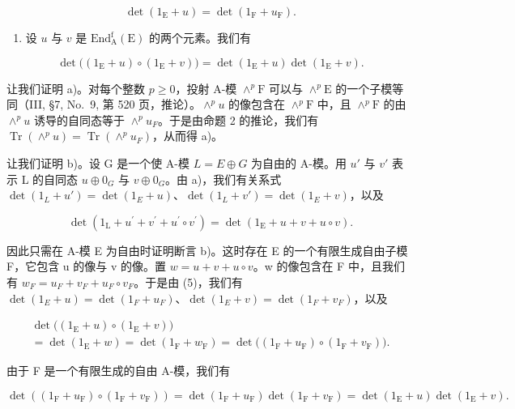 \[
\det (1 _ {\mathrm{E}} + u) = \det (1 _ {\mathrm{F}} + u _ {\mathrm{F}}).\tag{5}
\]

\begin{enumerate}
\def\labelenumi{\alph{enumi})}
\setcounter{enumi}{1}
\tightlist
\item
  设 \(u\) 与 \(v\) 是 \(\mathrm{End}_{\mathrm{A}}^{\mathrm{f}}(\mathrm{E})\) 的两个元素。我们有
\end{enumerate}

\[
\det \bigl ((1 _ {\mathrm{E}} + u) \circ (1 _ {\mathrm{E}} + v) \bigr) = \det (1 _ {\mathrm{E}} + u) \det (1 _ {\mathrm{E}} + v).\tag{6}
\]

让我们证明 a)。对每个整数 \(p \geqslant 0\)，投射 A-模 \(\wedge^p\mathrm{F}\) 可以与 \(\wedge^p\mathrm{E}\) 的一个子模等同（III, §7, No.~9, 第 520 页，推论）。\(\wedge^p u\) 的像包含在 \(\wedge^p\mathrm{F}\) 中，且 \(\wedge^p\mathrm{F}\) 的由 \(\wedge^{p}u\) 诱导的自同态等于 \(\wedge^{p}u_{F}\)。于是由命题 2 的推论，我们有 \(\operatorname{Tr}(\wedge^{p}u)=\operatorname{Tr}(\wedge^{p}u_{F})\)，从而得 a)。

让我们证明 b)。设 G 是一个使 A-模 \(L = E \oplus G\) 为自由的 A-模。用 \(u'\) 与 \(v'\) 表示 L 的自同态 \(u \oplus 0_{G}\) 与 \(v \oplus 0_{G}\)。由 a)，我们有关系式 \(\det(1_{L} + u') = \det(1_{E} + u)\)、\(\det(1_{L} + v') = \det(1_{E} + v)\)，以及

\[
\det (1 _ {\mathrm{L}} + u ^ {\prime} + v ^ {\prime} + u ^ {\prime} \circ v ^ {\prime}) = \det (1 _ {\mathrm{E}} + u + v + u \circ v).
\]

因此只需在 A-模 E 为自由时证明断言 b)。这时存在 E 的一个有限生成自由子模 F，它包含 u 的像与 v 的像。置 \(w = u + v + u \circ v\)。w 的像包含在 F 中，且我们有 \(w_{F} = u_{F} + v_{F} + u_{F} \circ v_{F}\)。于是由 (5)，我们有 \(\det(1_{E} + u) = \det(1_{F} + u_{F})\)、\(\det(1_{E} + v) = \det(1_{F} + v_{F})\)，以及

\[
\begin{array}{c} \det \bigl ((1 _ {\mathrm{E}} + u) \circ (1 _ {\mathrm{E}} + v) \bigr) \\ = \det (1 _ {\mathrm{E}} + w) = \det (1 _ {\mathrm{F}} + w _ {\mathrm{F}}) = \det \bigl ((1 _ {\mathrm{F}} + u _ {\mathrm{F}}) \circ (1 _ {\mathrm{F}} + v _ {\mathrm{F}}) \bigr). \end{array}
\]

由于 F 是一个有限生成的自由 A-模，我们有

\[
\det \left(\left(1 _ {\mathrm{F}} + u _ {\mathrm{F}}\right) \circ \left(1 _ {\mathrm{F}} + v _ {\mathrm{F}}\right)\right) = \det \left(1 _ {\mathrm{F}} + u _ {\mathrm{F}}\right) \det \left(1 _ {\mathrm{F}} + v _ {\mathrm{F}}\right) = \det \left(1 _ {\mathrm{E}} + u\right) \det \left(1 _ {\mathrm{E}} + v\right).
\]

